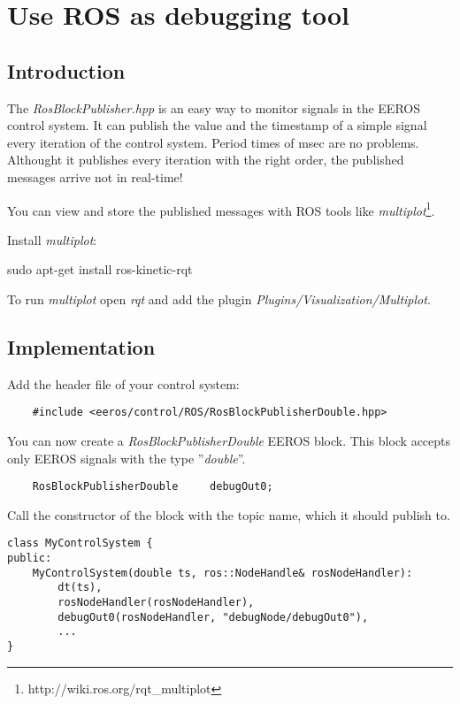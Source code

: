 \section{Use ROS as debugging tool}
\label{rosAsDebuggingTool}
\subsection{Introduction}
The \textit{RosBlockPublisher.hpp} is an easy way to monitor signals in the EEROS control system.
It can publish the value and the timestamp of a simple signal every iteration of the control system.
Period times of \unit[1]{msec} are no problems.
Althought it publishes every iteration with the right order, the published messages arrive not in real-time!

You can view and store the published messages with ROS tools like \textit{multiplot}\footnote{http://wiki.ros.org/rqt\_multiplot}.

Install \textit{multiplot}:
\begin{snugshade*}
	sudo apt-get install ros-kinetic-rqt
\end{snugshade*}

To run \textit{multiplot} open \textit{rqt} and add the plugin \textit{Plugins/Visualization/Multiplot}.

\subsection{Implementation}
Add the header file of your control system:
\lstset{language=c}
\begin{lstlisting}
	#include <eeros/control/ROS/RosBlockPublisherDouble.hpp>
\end{lstlisting}

You can now create a \textit{RosBlockPublisherDouble} EEROS block.
This block accepts only EEROS signals with the type ''\textit{double}''.
\lstset{language=c}
\begin{lstlisting}
	RosBlockPublisherDouble		debugOut0;
\end{lstlisting}

Call the constructor of the block with the topic name, which it should publish to.
\lstset{language=c}
\begin{lstlisting}
class MyControlSystem {
public:
	MyControlSystem(double ts, ros::NodeHandle& rosNodeHandler):
		dt(ts),
		rosNodeHandler(rosNodeHandler),
		debugOut0(rosNodeHandler, "debugNode/debugOut0"),
		...
}
\end{lstlisting}

